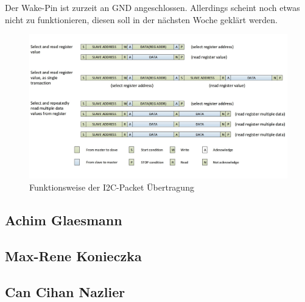 \documentclass[]{article}
\begin{document}
Der Wake-Pin ist zurzeit an GND angeschlossen. Allerdings scheint noch etwas nicht zu funktionieren, diesen soll in der nächsten Woche geklärt werden. 
\begin{figure}[h]
	\centering
	\includegraphics[scale=0.30]{images/i2c_ccs811}
	\caption{Funktionsweise der I2C-Packet Übertragung\cite{datasheetcss811}}
	\label{img:I2C_ccs811}
\end{figure}


\subsection{Achim Glaesmann}

\subsection{Max-Rene Konieczka}

\subsection{Can Cihan Nazlier}

\printbibliography
\end{document}
